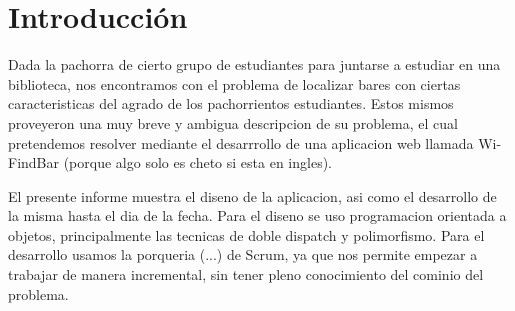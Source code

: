 \section{Introducción}
Dada la pachorra de cierto grupo de estudiantes para juntarse a estudiar en una biblioteca, nos encontramos con el problema de localizar bares con ciertas caracteristicas del 
agrado de los pachorrientos estudiantes. Estos mismos proveyeron una muy breve y ambigua descripcion de su problema, el cual pretendemos resolver mediante el desarrrollo de una 
aplicacion web llamada Wi-FindBar (porque algo solo es cheto si esta en ingles). 

El presente informe muestra el diseno de la aplicacion, asi como el desarrollo de la misma hasta el dia de la fecha. Para el diseno se uso programacion orientada a objetos, 
principalmente las tecnicas de doble dispatch y polimorfismo. Para el desarrollo usamos la porqueria (...) de Scrum, ya que nos permite empezar a trabajar de manera incremental, sin tener
pleno conocimiento del cominio del problema.
